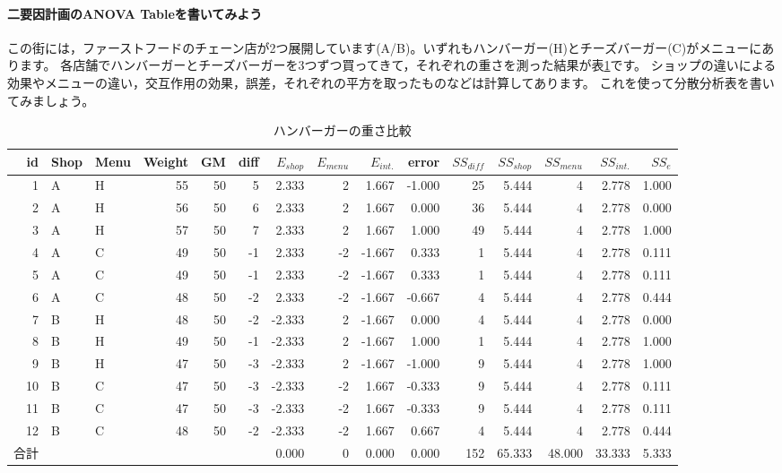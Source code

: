 \documentclass{ltjbook}
\begin{document}
\paragraph{二要因計画のANOVA Tableを書いてみよう}
この街には，ファーストフードのチェーン店が2つ展開しています(A/B)。いずれもハンバーガー(H)とチーズバーガー(C)がメニューにあります。
各店舗でハンバーガーとチーズバーガーを3つずつ買ってきて，それぞれの重さを測った結果が表\ref{anovaExample2}です。
ショップの違いによる効果やメニューの違い，交互作用の効果，誤差，それぞれの平方を取ったものなどは計算してあります。
これを使って分散分析表を書いてみましょう。
\begin{landscape}
\begin{table}
  \centering
  \caption{ハンバーガーの重さ比較}
  \begin{tabular}{rllrrrrrrrrrrrr}
  id & Shop & Menu & Weight & GM & diff & $E_{shop}$ & $E_{menu}$ & $E_{int.}$ & error & $SS_{diff}$ & $SS_{shop}$ & $SS_{menu}$ & $SS_{int.}$ & $SS_{e}$\\\hline\hline
  1 & A & H & 55 & 50 & 5 & 2.333 & 2 & 1.667 & -1.000 & 25 & 5.444 & 4 & 2.778 & 1.000\\
  2 & A & H & 56 & 50 & 6 & 2.333 & 2 & 1.667 & 0.000 & 36 & 5.444 & 4 & 2.778 & 0.000\\
  3 & A & H & 57 & 50 & 7 & 2.333 & 2 & 1.667 & 1.000 & 49 & 5.444 & 4 & 2.778 & 1.000\\
  4 & A & C & 49 & 50 & -1 & 2.333 & -2 & -1.667 & 0.333 & 1 & 5.444 & 4 & 2.778 & 0.111\\
  5 & A & C & 49 & 50 & -1 & 2.333 & -2 & -1.667 & 0.333 & 1 & 5.444 & 4 & 2.778 & 0.111\\
  6 & A & C & 48 & 50 & -2 & 2.333 & -2 & -1.667 & -0.667 & 4 & 5.444 & 4 & 2.778 & 0.444\\
  7 & B & H & 48 & 50 & -2 & -2.333 & 2 & -1.667 & 0.000 & 4 & 5.444 & 4 & 2.778 & 0.000\\
  8 & B & H & 49 & 50 & -1 & -2.333 & 2 & -1.667 & 1.000 & 1 & 5.444 & 4 & 2.778 & 1.000\\
  9 & B & H & 47 & 50 & -3 & -2.333 & 2 & -1.667 & -1.000 & 9 & 5.444 & 4 & 2.778 & 1.000\\
  10 & B & C & 47 & 50 & -3 & -2.333 & -2 & 1.667 & -0.333 & 9 & 5.444 & 4 & 2.778 & 0.111\\
  11 & B & C & 47 & 50 & -3 & -2.333 & -2 & 1.667 & -0.333 & 9 & 5.444 & 4 & 2.778 & 0.111\\
  12 & B & C & 48 & 50 & -2 & -2.333 & -2 & 1.667 & 0.667 & 4 & 5.444 & 4 & 2.778 & 0.444\\\hline
  合計 &  &  &  &  &  & 0.000 & 0 & 0.000 & 0.000 & 152 & 65.333 & 48.000 & 33.333 & 5.333\\\hline
  \end{tabular}
  \label{anovaExample2}
\end{table}
\end{landscape}
\end{document}
